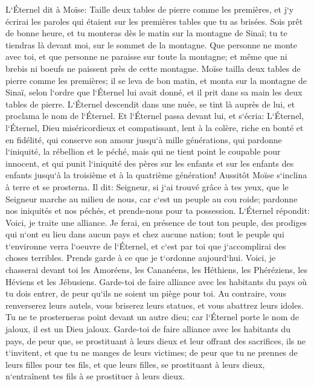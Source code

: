 \verse L`Éternel dit à Moïse: Taille deux tables de pierre comme les premières, et j`y écrirai les paroles qui étaient sur les premières tables que tu as brisées. 
\verse Sois prêt de bonne heure, et tu monteras dès le matin sur la montagne de Sinaï; tu te tiendras là devant moi, sur le sommet de la montagne. 
\verse Que personne ne monte avec toi, et que personne ne paraisse sur toute la montagne; et même que ni brebis ni boeufs ne paissent près de cette montagne. 
\verse Moïse tailla deux tables de pierre comme les premières; il se leva de bon matin, et monta sur la montagne de Sinaï, selon l`ordre que l`Éternel lui avait donné, et il prit dans sa main les deux tables de pierre. 
\verse L`Éternel descendit dans une nuée, se tint là auprès de lui, et proclama le nom de l`Éternel. 
\verse Et l`Éternel passa devant lui, et s`écria: L`Éternel, l`Éternel, Dieu miséricordieux et compatissant, lent à la colère, riche en bonté et en fidélité, 
\verse qui conserve son amour jusqu`à mille générations, qui pardonne l`iniquité, la rébellion et le péché, mais qui ne tient point le coupable pour innocent, et qui punit l`iniquité des pères sur les enfants et sur les enfants des enfants jusqu`à la troisième et à la quatrième génération! 
\verse Aussitôt Moïse s`inclina à terre et se prosterna. 
\verse Il dit: Seigneur, si j`ai trouvé grâce à tes yeux, que le Seigneur marche au milieu de nous, car c`est un peuple au cou roide; pardonne nos iniquités et nos péchés, et prends-nous pour ta possession. 
\verse L`Éternel répondit: Voici, je traite une alliance. Je ferai, en présence de tout ton peuple, des prodiges qui n`ont eu lieu dans aucun pays et chez aucune nation; tout le peuple qui t`environne verra l`oeuvre de l`Éternel, et c`est par toi que j`accomplirai des choses terribles. 
\verse Prends garde à ce que je t`ordonne aujourd`hui. Voici, je chasserai devant toi les Amoréens, les Cananéens, les Héthiens, les Phéréziens, les Héviens et les Jébusiens. 
\verse Garde-toi de faire alliance avec les habitants du pays où tu dois entrer, de peur qu`ils ne soient un piège pour toi. 
\verse Au contraire, vous renverserez leurs autels, vous briserez leurs statues, et vous abattrez leurs idoles. 
\verse Tu ne te prosterneras point devant un autre dieu; car l`Éternel porte le nom de jaloux, il est un Dieu jaloux. 
\verse Garde-toi de faire alliance avec les habitants du pays, de peur que, se prostituant à leurs dieux et leur offrant des sacrifices, ils ne t`invitent, et que tu ne manges de leurs victimes; 
\verse de peur que tu ne prennes de leurs filles pour tes fils, et que leurs filles, se prostituant à leurs dieux, n`entraînent tes fils à se prostituer à leurs dieux. 
